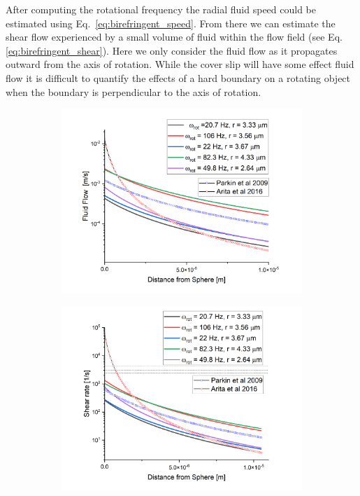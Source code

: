 After computing the rotational frequency the radial fluid speed 
could be estimated using Eq.~\eqref{eq:birefringent_speed}. From 
there we can estimate the shear flow experienced by a small volume 
of fluid within the flow field (see Eq.\eqref{eq:birefringent_shear}). 
Here we only consider the fluid flow as it propagates outward from 
the axis of rotation. While the cover slip will have some effect 
fluid flow it is difficult to quantify the effects of a hard 
boundary on a rotating object when the boundary is perpendicular to 
the axis of rotation. 
\begin{figure}[h!]
	\centering
	\begin{subfigure}{0.7\linewidth}
		\includegraphics[width=\linewidth]{vaterite_fluid_flow.png}
		\caption{}
	\end{subfigure}
	\begin{subfigure}{0.7\linewidth}
		\includegraphics[width=\linewidth]{vaterite_shear_rate.png}

\end{subfigure}
\end{figure}
